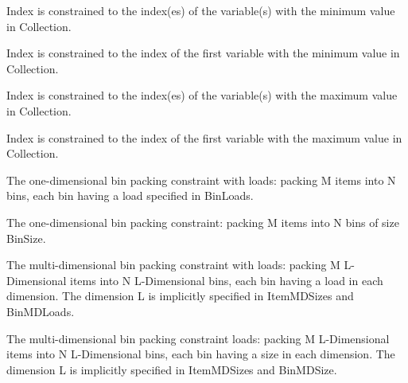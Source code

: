 \begin{description}
\item[]
Index is constrained to the index(es) of the variable(s) with the minimum value in Collection.

\item[]
Index is constrained to the index of the first variable with the minimum value in Collection.

\item[]
Index is constrained to the index(es) of the variable(s) with the maximum value 
in Collection.

\item[]
Index is constrained to the index of the first variable with the maximum value in Collection.

\item[]
The one-dimensional bin packing constraint with loads: packing 
M items into N bins, each bin having a load specified in BinLoads.

\item[]
The one-dimensional bin packing constraint: packing M items
into N bins of size BinSize.

\item[]
The multi-dimensional bin packing constraint with loads: packing 
M L-Dimensional items into N L-Dimensional bins, each bin having a load in 
each dimension. The dimension L is implicitly specified in ItemMDSizes and
BinMDLoads.

\begin{sloppypar}
\item[\biptxtrefni{bin_packing_md(+Items,++ItemMDSizes,+N,+BinMDSize)}{bin_packing/4!gfd}{../bips/lib/gfd/bin_packing-4.html}]
The multi-dimensional bin packing constraint  loads: packing M L-Dimensional 
items into N L-Dimensional bins, each bin having a size in each dimension.
The dimension L is implicitly specified in ItemMDSizes and BinMDSize.
\end{sloppypar}


\end{description}
